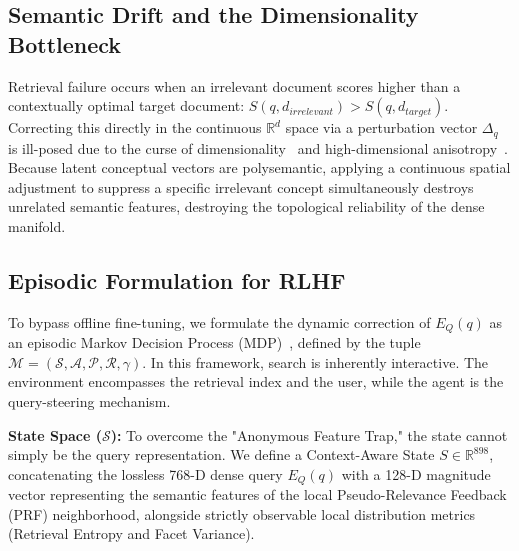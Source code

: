 \subsection{Semantic Drift and the Dimensionality Bottleneck}
Retrieval failure occurs when an irrelevant document scores higher than a contextually optimal target document: $S(q, d_{irrelevant}) > S(q, d_{target})$. Correcting this directly in the continuous $\mathbb{R}^d$ space via a perturbation vector $\Delta_q$ is ill-posed due to the curse of dimensionality~\citep{beyer1999} and high-dimensional anisotropy~\citep{ethayarajh2019}. Because latent conceptual vectors are polysemantic, applying a continuous spatial adjustment to suppress a specific irrelevant concept simultaneously destroys unrelated semantic features, destroying the topological reliability of the dense manifold.

\subsection{Episodic Formulation for RLHF}
To bypass offline fine-tuning, we formulate the dynamic correction of $E_Q(q)$ as an episodic Markov Decision Process (MDP)~\citep{sutton2018}, defined by the tuple $\mathcal{M} = (\mathcal{S}, \mathcal{A}, \mathcal{P}, \mathcal{R}, \gamma)$. In this framework, search is inherently interactive. The environment encompasses the retrieval index and the user, while the agent is the query-steering mechanism.

\textbf{State Space ($\mathcal{S}$):} To overcome the "Anonymous Feature Trap," the state cannot simply be the query representation. We define a Context-Aware State $S \in \mathbb{R}^{898}$, concatenating the lossless 768-D dense query $E_Q(q)$ with a 128-D magnitude vector representing the semantic features of the local Pseudo-Relevance Feedback (PRF) neighborhood, alongside strictly observable local distribution metrics (Retrieval Entropy and Facet Variance).

